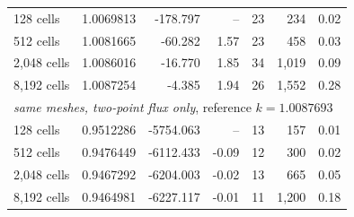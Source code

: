 \begin{tabular}{lrrrrrr}
128 cells & 1.0069813 & -178.797 & -- & 23 & 234 & 0.02\\
512 cells & 1.0081665 & -60.282 & 1.57 & 23 & 458 & 0.03\\
2,048 cells & 1.0086016 & -16.770 & 1.85 & 34 & 1,019 & 0.09\\
8,192 cells & 1.0087254 & -4.385 & 1.94 & 26 & 1,552 & 0.28\\
\multicolumn{7}{l}{\textit{same meshes, two-point flux only}, reference $k = 1.0087693$}\\
128 cells & 0.9512286 & -5754.063 & -- & 13 & 157 & 0.01\\
512 cells & 0.9476449 & -6112.433 & -0.09 & 12 & 300 & 0.02\\
2,048 cells & 0.9467292 & -6204.003 & -0.02 & 13 & 665 & 0.05\\
8,192 cells & 0.9464981 & -6227.117 & -0.01 & 11 & 1,200 & 0.18\\
\hline
\end{tabular}
